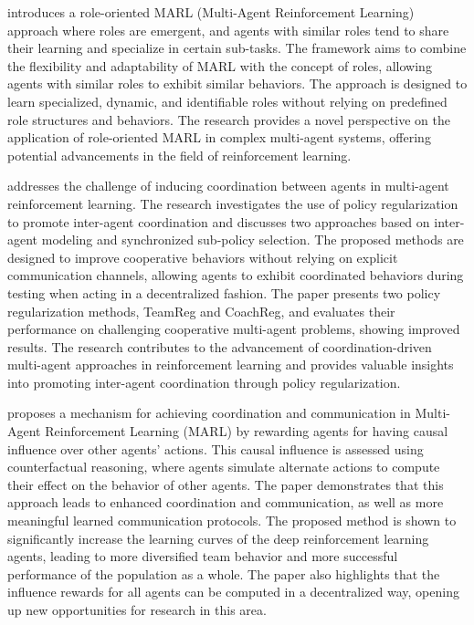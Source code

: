 \documentclass[runningheads]{llncs}
\begin{document}
\cite{Wang2020} introduces a role-oriented MARL (Multi-Agent Reinforcement Learning) approach where roles are emergent, and agents with similar roles tend to share their learning and specialize in certain sub-tasks. The framework aims to combine the flexibility and adaptability of MARL with the concept of roles, allowing agents with similar roles to exhibit similar behaviors. The approach is designed to learn specialized, dynamic, and identifiable roles without relying on predefined role structures and behaviors. The research provides a novel perspective on the application of role-oriented MARL in complex multi-agent systems, offering potential advancements in the field of reinforcement learning.

\cite{Roy2020} addresses the challenge of inducing coordination between agents in multi-agent reinforcement learning. The research investigates the use of policy regularization to promote inter-agent coordination and discusses two approaches based on inter-agent modeling and synchronized sub-policy selection. The proposed methods are designed to improve cooperative behaviors without relying on explicit communication channels, allowing agents to exhibit coordinated behaviors during testing when acting in a decentralized fashion. The paper presents two policy regularization methods, TeamReg and CoachReg, and evaluates their performance on challenging cooperative multi-agent problems, showing improved results. The research contributes to the advancement of coordination-driven multi-agent approaches in reinforcement learning and provides valuable insights into promoting inter-agent coordination through policy regularization.

\cite{Jaques2019} proposes a mechanism for achieving coordination and communication in Multi-Agent Reinforcement Learning (MARL) by rewarding agents for having causal influence over other agents' actions. This causal influence is assessed using counterfactual reasoning, where agents simulate alternate actions to compute their effect on the behavior of other agents. The paper demonstrates that this approach leads to enhanced coordination and communication, as well as more meaningful learned communication protocols. The proposed method is shown to significantly increase the learning curves of the deep reinforcement learning agents, leading to more diversified team behavior and more successful performance of the population as a whole. The paper also highlights that the influence rewards for all agents can be computed in a decentralized way, opening up new opportunities for research in this area.
\end{document}
